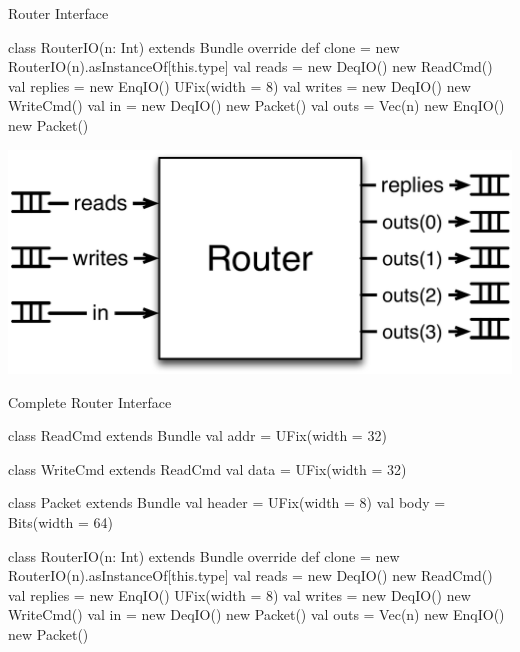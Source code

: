 \documentclass[xcolor=pdflatex,dvipsnames,table]{beamer}
\begin{document}
\begin{frame}[fragile]{Router Interface}
\begin{scala}
class RouterIO(n: Int) extends Bundle {
  override def clone = new RouterIO(n).asInstanceOf[this.type]
  val reads   = new DeqIO(){ new ReadCmd() }
  val replies = new EnqIO(){ UFix(width = 8) }
  val writes  = new DeqIO(){ new WriteCmd() }
  val in      = new DeqIO(){ new Packet() }
  val outs    = Vec(n){ new EnqIO(){ new Packet() } }
}
\end{scala}
\begin{center}
\includegraphics[height=0.45\textheight]{../bootcamp/figs/trouter.pdf} 
\end{center}
\end{frame}

\begin{frame}[fragile]{Complete Router Interface}

{
\begin{scala}
class ReadCmd extends Bundle {
  val addr = UFix(width = 32)
}

class WriteCmd extends ReadCmd {
  val data = UFix(width = 32)
}

class Packet extends Bundle {
  val header = UFix(width = 8)
  val body   = Bits(width = 64)
}

class RouterIO(n: Int) extends Bundle {
  override def clone = new RouterIO(n).asInstanceOf[this.type]
  val reads   = new DeqIO(){ new ReadCmd() }
  val replies = new EnqIO(){ UFix(width = 8) }
  val writes  = new DeqIO(){ new WriteCmd() }
  val in      = new DeqIO(){ new Packet() }
  val outs    = Vec(n){ new EnqIO(){ new Packet() } }
}
\end{scala}
}
\end{frame}
\end{document}
